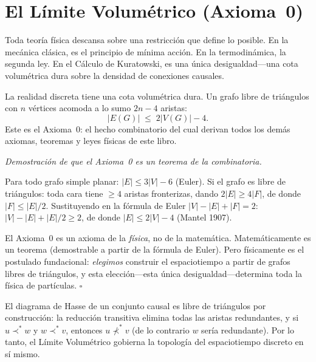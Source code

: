 \documentclass[11pt, a4paper, openany]{book}
\newcommand{\covers}{\prec^{\!*}}
\renewenvironment{proof}[1][Demostraci\'on]{%
  \par\noindent\textit{#1.}\quad
}{\hfill$\square$\par\medskip}
\begin{document}
\section{El L\'imite Volum\'etrico (Axioma~0)}
\label{sec:volumetric-limit}

Toda teor\'ia f\'isica descansa sobre una restricci\'on que define lo
posible. En la mec\'anica cl\'asica, es el principio de m\'inima
acci\'on. En la termodin\'amica, la segunda ley. En el C\'alculo de
Kuratowski, es una \'unica desigualdad---una cota volum\'etrica dura
sobre la densidad de conexiones causales.

\begin{axiom}
\label{ax:volumetric-limit}
La realidad discreta tiene una cota volum\'etrica dura. Un grafo libre
de tri\'angulos con $n$ v\'ertices acomoda a lo sumo $2n - 4$ aristas:
\begin{equation}
\label{eq:volumetric-limit}
  |E(G)| \;\leq\; 2|V(G)| - 4.
\end{equation}
Este es el Axioma~0: el hecho combinatorio del cual derivan todos los
dem\'as axiomas, teoremas y leyes f\'isicas de este libro.
\end{axiom}

\begin{proof}[Demostraci\'on de que el Axioma~0 es un teorema de la combinatoria]
Para todo grafo simple planar: $|E| \leq 3|V| - 6$ (Euler). Si el
grafo es libre de tri\'angulos: toda cara tiene $\geq 4$ aristas
fronterizas, dando $2|E| \geq 4|F|$, de donde $|F| \leq |E|/2$.
Sustituyendo en la f\'ormula de Euler $|V| - |E| + |F| = 2$:
$|V| - |E| + |E|/2 \geq 2$, de donde $|E| \leq 2|V| - 4$
(Mantel 1907).

El Axioma~0 es un axioma de la \emph{f\'isica}, no de la matem\'atica.
Matem\'aticamente es un teorema (demostrable a partir de la f\'ormula de
Euler). Pero f\'isicamente es el postulado fundacional: \emph{elegimos}
construir el espaciotiempo a partir de grafos libres de tri\'angulos, y
esta elecci\'on---esta \'unica desigualdad---determina toda la f\'isica
de part\'iculas.
\end{proof}

\noindent
El diagrama de Hasse de un conjunto causal es libre de tri\'angulos por
construcci\'on: la reducci\'on transitiva elimina todas las aristas
redundantes, y si $u \covers w$ y $w \covers v$, entonces
$u \not\covers v$ (de lo contrario $w$ ser\'ia redundante). Por lo
tanto, el L\'imite Volum\'etrico gobierna la topolog\'ia del
espaciotiempo discreto en s\'i mismo.
\end{document}
